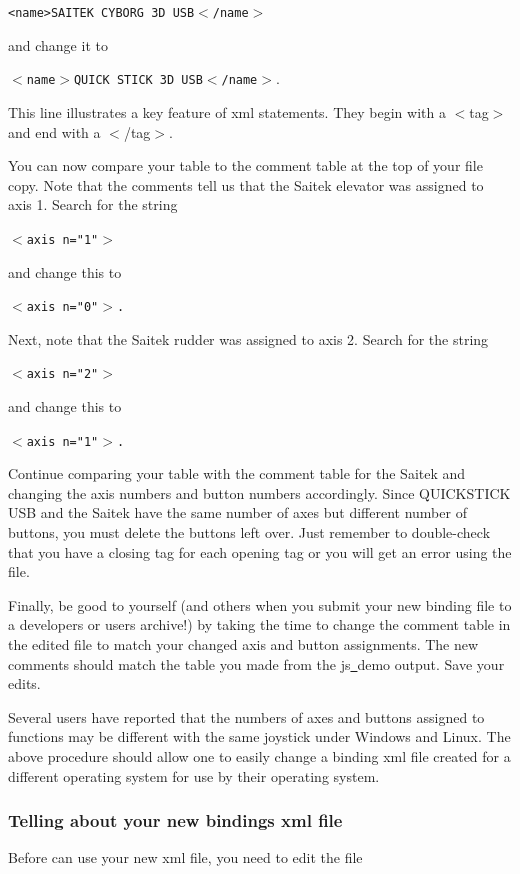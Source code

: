 \texttt{<name>SAITEK CYBORG 3D USB$<$/name$>$}
\medskip

\noindent
and change it to
\medskip

	\texttt{$<$name$>$QUICK STICK 3D USB$<$/name$>$}.
	\medskip

\noindent
This line illustrates a key feature of xml statements.  They begin with a $<$tag$>$ and end with a $<$/tag$>$.

You can now compare your table to the comment table at the top of your file copy.  Note that the comments tell us that the Saitek elevator was assigned to axis 1.  Search for the string
\medskip

	\texttt{$<$axis n="1"$>$}
\medskip

\noindent
and change this to
\medskip

	\texttt{$<$axis n="0"$>$.}
\medskip

Next, note that the Saitek rudder was assigned to axis 2.  Search for the string
\medskip

	\texttt{$<$axis n="2"$>$}

\noindent
and change this to
\medskip

	\texttt{$<$axis n="1"$>$.}
\medskip

\noindent
Continue comparing your table with the comment table for the Saitek and changing the axis numbers and button numbers accordingly.  Since QUICKSTICK USB and the Saitek have the same number of axes but different number of buttons, you must delete the buttons left over.  Just remember to double-check that you have a closing tag for each opening tag or you will get an error using the file.

Finally, be good to yourself (and others when you submit your new binding file to a \FlightGear{} developers or users archive!) by taking the time to change the comment table in the edited file to match your changed axis and button assignments.  The new comments should match the table you made from the js\underline{~}demo output.  Save your edits.

Several users have reported that the numbers of axes and buttons assigned to functions may be different with the same joystick under Windows and Linux.  The above procedure should allow one to easily change a binding xml file created for a different operating system for use by their operating system.

\subsubsection{Telling \FlightGear{} about your new bindings xml file\label{telling}}
Before \FlightGear{} can use your new xml file, you need to edit the file


